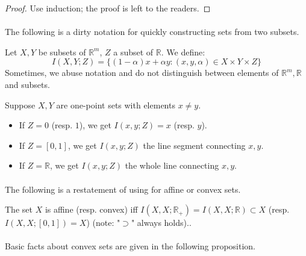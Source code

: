 \begin{proof}
	Use induction; the proof is left to the readers.
\end{proof}

\paragraph{}The following is a dirty notation for quickly constructing sets from two subsets.

\begin{defn}[$I(X,Y;Z)$]\label{defn:011-I}
	Let $X,Y$ be subsets of $\mathbb{R}^m$, $Z$ a subset of $\mathbb{R}$. We define:
	\[
		I(X,Y;Z)=\{(1-\alpha)x+\alpha y:(x,y,\alpha)\in X\times Y\times Z\}
	\]
	Sometimes, we abuse notation and do not distinguish between elements of $\mathbb{R}^m,\mathbb{R}$ and subsets.
\end{defn}

\begin{exmp}\label{defn:011-I-exmpl}
	Suppose $X,Y$ are one-point sets with elements $x\neq y$.
	\begin{itemize}
		\item If $Z=0$ (resp. $1$), we get $I(x,y;Z)=x$ (resp. $y$).
		\item If $Z=[0,1]$, we get $I(x,y;Z)$ the line segment connecting $x, y$.
		\item If $Z=\mathbb{R}$, we get $I(x,y;Z)$ the whole line connecting $x, y$.
	\end{itemize}
\end{exmp}

\paragraph{}The following is a restatement of  using  for affine or convex sets.

\begin{prop}The set $X$ is affine (resp. convex) iff $I(X,X;\mathbb{R}_{+})=I(X,X;\mathbb{R})\subset X$ (resp. $I(X,X;[0,1])=X$) (note: "$\supset$" always holds)..
\end{prop}

\paragraph{}Basic facts about convex sets are given in the following proposition.

